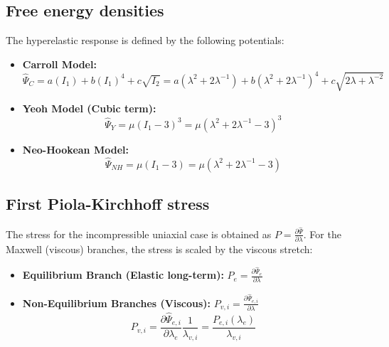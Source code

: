\documentclass[a4paper,12pt]{article}
\newcommand{\pder}[2]{\frac{\partial #1}{\partial #2}}
\newcommand{\0}{\mathbf{0}}
\begin{document}
\subsection{Free energy densities}
The hyperelastic response is defined by the following potentials:

\begin{itemize}
    \item \textbf{Carroll Model:}
    \begin{equation}
        \hat\Psi_{C} = a(I_1) + b(I_1)^4 + c\sqrt{I_2} = a(\lambda^2 + 2\lambda^{-1}) + b(\lambda^2 + 2\lambda^{-1})^4 + c\sqrt{2\lambda + \lambda^{-2}}
    \end{equation}

    \item \textbf{Yeoh Model (Cubic term):}
    \begin{equation}
        \hat\Psi_{Y} = \mu (I_1 - 3)^3 = \mu (\lambda^2 + 2\lambda^{-1} - 3)^3
    \end{equation}

    \item \textbf{Neo-Hookean Model:}
    \begin{equation}
        \hat\Psi_{NH} = \mu (I_1 - 3) = \mu (\lambda^2 + 2\lambda^{-1} - 3)
    \end{equation}
\end{itemize}



\subsection{First Piola-Kirchhoff stress}
The stress for the incompressible uniaxial case is obtained as $P = \pder{\hat\Psi}{\lambda}$. For the Maxwell (viscous) branches, the stress is scaled by the viscous stretch:

\begin{itemize}
    \item \textbf{Equilibrium Branch (Elastic long-term):} $P_{e} = \pder{\hat\Psi_{e}}{\lambda}$
    \item \textbf{Non-Equilibrium Branches (Viscous):} $P_{v,i} = \pder{\hat\Psi_{e,i}}{\lambda}$
    \begin{equation}
        P_{v,i} = \pder{\hat\Psi_{e,i}}{\lambda_e} \frac{1}{\lambda_{v,i}} = \frac{P_{e,i}(\lambda_e)}{\lambda_{v,i}}
    \end{equation}
\end{itemize}
\end{document}
